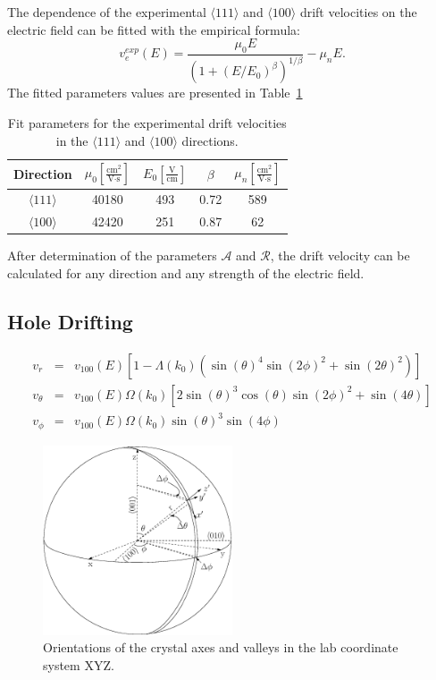 The dependence of the experimental $\langle111\rangle$ and $\langle100\rangle$ drift velocities on the electric field can be fitted with the empirical formula: 
\begin{equation}
  \label{eq:expe}  
  v_{e}^{exp}(E) = \frac{\mu_{0}E}{(1+(E/E_{0})^{\beta})^{1/\beta}} - \mu_{n}E.
\end{equation}
The fitted parameters values are presented in Table~\ref{tab:pars}
\begin{table}[tbhp]
  \centering
  \begin{tabular}{ccccc}\hline\hline
    Direction & $\mu_{0} \left[ \frac{\mbox{cm}^{2}}{\mbox{V}\cdot\mbox{s}} \right]$ & $E_{0} \left[ \frac{\mbox{V}}{\mbox{cm}} \right]$ & $\beta$ & $\mu_{n} \left[ \frac{\mbox{cm}^{2}}{\mbox{V}\cdot\mbox{s}} \right]$ \\\hline
$\langle111\rangle$ & 40180 & 493 & 0.72 & 589 \\
$\langle100\rangle$ & 42420 & 251 & 0.87 & 62\\ \hline\hline
  \end{tabular}
  \caption{Fit parameters for the experimental drift velocities in the 
$\langle111\rangle$ and $\langle100\rangle$ directions.}
\label{tab:pars}
\end{table}

After determination of the parameters $\mathcal{A}$ and $\mathcal{R}$, the drift velocity can be calculated for any direction and any strength of the electric field.

\subsection{Hole Drifting}
\label{sec:hole}
\begin{equation}
  \label{eq:vsphere}
  \begin{array}{rcl}
   v_{r} &=& v_{100}(E)[1-\Lambda(k_{0})(\sin(\theta)^{4}\sin(2\phi)^{2} + \sin(2\theta)^{2})]\\
   v_{\theta} &=& v_{100}(E)\Omega(k_{0})[2\sin(\theta)^{3}\cos(\theta)\sin(2\phi)^{2} + \sin(4\theta)]\\
    v_{\phi} &=& v_{100}(E)\Omega(k_{0})\sin(\theta)^{3}\sin(4\phi)
  \end{array}
\end{equation}


\begin{figure}[tbhp]
  \centering
  \includegraphics[width=0.5\textwidth]{vsphere.eps}  
  \caption{Orientations of the crystal axes and valleys in the lab coordinate system XYZ.}
  \label{fig:vsphere}
\end{figure}


